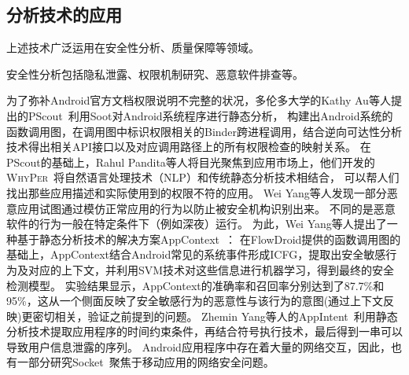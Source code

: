 \subsection{分析技术的应用}

上述技术广泛运用在安全性分析、质量保障等领域。


安全性分析包括隐私泄露、权限机制研究、恶意软件排查等。

为了弥补Android官方文档权限说明不完整的状况，多伦多大学的Kathy Au等人提出的PScout~\cite{au2012pscout}利用Soot对Android系统程序进行静态分析，
构建出Android系统的函数调用图，在调用图中标识权限相关的Binder跨进程调用，结合逆向可达性分析技术得出相关API接口以及对应调用路径上的所有权限检查的映射关系。
在PScout的基础上，Rahul Pandita等人将目光聚焦到应用市场上，他们开发的\textsc{WhyPer}~\cite{pandita2013whyper}将自然语言处理技术（NLP）和传统静态分析技术相结合，
可以帮人们找出那些应用描述和实际使用到的权限不符的应用。
Wei Yang等人发现一部分恶意应用试图通过模仿正常应用的行为以防止被安全机构识别出来。%
不同的是恶意软件的行为一般在特定条件下（例如深夜）运行。
为此，Wei Yang等人提出了一种基于静态分析技术的解决方案AppContext~\cite{yang2015appcontext}：
在FlowDroid提供的函数调用图的基础上，AppContext结合Android常见的系统事件形成ICFG，提取出安全敏感行为及对应的上下文，并利用SVM技术对这些信息进行机器学习，得到最终的安全检测模型。
实验结果显示，AppContext的准确率和召回率分别达到了87.7\%和95\%，这从一个侧面反映了安全敏感行为的恶意性与该行为的意图(通过上下文反映)更密切相关，验证之前提到的问题。
Zhemin Yang等人的AppIntent~\cite{yang2013appintent}利用静态分析技术提取应用程序的时间约束条件，再结合符号执行技术，最后得到一串可以导致用户信息泄露的序列。
Android应用程序中存在着大量的网络交互，因此，也有一部分研究Socket~\cite{Shao2016The,Jia2017Open,bu2017program}聚焦于移动应用的网络安全问题。




